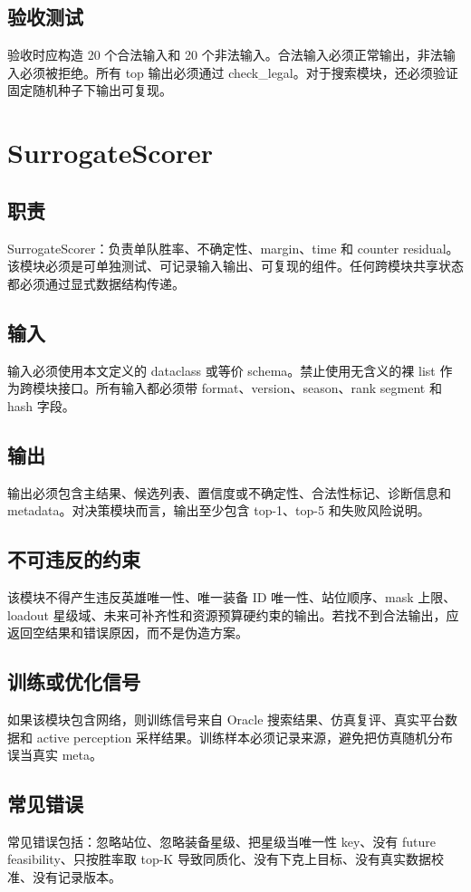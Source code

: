 \documentclass[UTF8,12pt,openany]{ctexbook}
\begin{document}
\subsection{验收测试}
验收时应构造 20 个合法输入和 20 个非法输入。合法输入必须正常输出，非法输入必须被拒绝。所有 top 输出必须通过 check\_legal。对于搜索模块，还必须验证固定随机种子下输出可复现。

\section{SurrogateScorer}
\subsection{职责}
SurrogateScorer：负责单队胜率、不确定性、margin、time 和 counter residual。 该模块必须是可单独测试、可记录输入输出、可复现的组件。任何跨模块共享状态都必须通过显式数据结构传递。

\subsection{输入}
输入必须使用本文定义的 dataclass 或等价 schema。禁止使用无含义的裸 list 作为跨模块接口。所有输入都必须带 format、version、season、rank segment 和 hash 字段。

\subsection{输出}
输出必须包含主结果、候选列表、置信度或不确定性、合法性标记、诊断信息和 metadata。对决策模块而言，输出至少包含 top-1、top-5 和失败风险说明。

\subsection{不可违反的约束}
该模块不得产生违反英雄唯一性、唯一装备 ID 唯一性、站位顺序、mask 上限、loadout 星级域、未来可补齐性和资源预算硬约束的输出。若找不到合法输出，应返回空结果和错误原因，而不是伪造方案。

\subsection{训练或优化信号}
如果该模块包含网络，则训练信号来自 Oracle 搜索结果、仿真复评、真实平台数据和 active perception 采样结果。训练样本必须记录来源，避免把仿真随机分布误当真实 meta。

\subsection{常见错误}
常见错误包括：忽略站位、忽略装备星级、把星级当唯一性 key、没有 future feasibility、只按胜率取 top-K 导致同质化、没有下克上目标、没有真实数据校准、没有记录版本。
\end{document}
